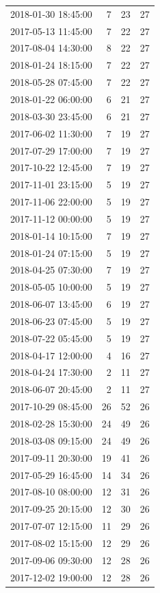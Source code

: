 \begin{tabular}{lrrr}
2018-01-30 18:45:00 & 7 & 23 & 27 \\
2017-05-13 11:45:00 & 7 & 22 & 27 \\
2017-08-04 14:30:00 & 8 & 22 & 27 \\
2018-01-24 18:15:00 & 7 & 22 & 27 \\
2018-05-28 07:45:00 & 7 & 22 & 27 \\
2018-01-22 06:00:00 & 6 & 21 & 27 \\
2018-03-30 23:45:00 & 6 & 21 & 27 \\
2017-06-02 11:30:00 & 7 & 19 & 27 \\
2017-07-29 17:00:00 & 7 & 19 & 27 \\
2017-10-22 12:45:00 & 7 & 19 & 27 \\
2017-11-01 23:15:00 & 5 & 19 & 27 \\
2017-11-06 22:00:00 & 5 & 19 & 27 \\
2017-11-12 00:00:00 & 5 & 19 & 27 \\
2018-01-14 10:15:00 & 7 & 19 & 27 \\
2018-01-24 07:15:00 & 5 & 19 & 27 \\
2018-04-25 07:30:00 & 7 & 19 & 27 \\
2018-05-05 10:00:00 & 5 & 19 & 27 \\
2018-06-07 13:45:00 & 6 & 19 & 27 \\
2018-06-23 07:45:00 & 5 & 19 & 27 \\
2018-07-22 05:45:00 & 5 & 19 & 27 \\
2018-04-17 12:00:00 & 4 & 16 & 27 \\
2018-04-24 17:30:00 & 2 & 11 & 27 \\
2018-06-07 20:45:00 & 2 & 11 & 27 \\
2017-10-29 08:45:00 & 26 & 52 & 26 \\
2018-02-28 15:30:00 & 24 & 49 & 26 \\
2018-03-08 09:15:00 & 24 & 49 & 26 \\
2017-09-11 20:30:00 & 19 & 41 & 26 \\
2017-05-29 16:45:00 & 14 & 34 & 26 \\
2017-08-10 08:00:00 & 12 & 31 & 26 \\
2017-09-25 20:15:00 & 12 & 30 & 26 \\
2017-07-07 12:15:00 & 11 & 29 & 26 \\
2017-08-02 15:15:00 & 12 & 29 & 26 \\
2017-09-06 09:30:00 & 12 & 28 & 26 \\
2017-12-02 19:00:00 & 12 & 28 & 26 \\

\end{tabular}

